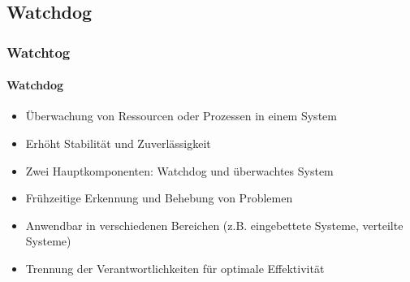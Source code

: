 \subsection{Watchdog}
\begin{frame}
  \frametitle{Watchtog}
  \framesubtitle{Watchdog}
  \begin{itemize}
  \item Überwachung von Ressourcen oder Prozessen in einem System
  \item Erhöht Stabilität und Zuverlässigkeit
  \item Zwei Hauptkomponenten: Watchdog und überwachtes System
  \item Frühzeitige Erkennung und Behebung von Problemen
  \item Anwendbar in verschiedenen Bereichen (z.B. eingebettete Systeme, verteilte Systeme)
  \item Trennung der Verantwortlichkeiten für optimale Effektivität
\end{itemize}
\end{frame}
